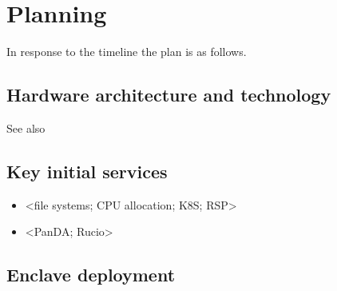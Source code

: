 \section{Planning}\label{sec:plan}

In response to the timeline  the plan is as follows.

\subsection {Hardware architecture and technology}
See also 

\subsection{Key initial services}

\begin{itemize}
\item <file systems; CPU allocation; K8S; RSP>

\item <PanDA; Rucio>

\end{itemize}

\subsection {Enclave deployment}
